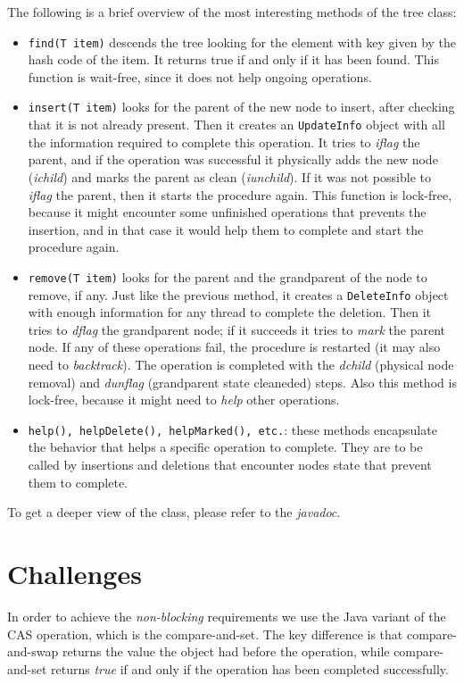 \documentclass[a4paper,12pt]{article}
\begin{document}
The following is a brief overview of the most interesting methods of the tree class:
\begin{itemize}
    \item \texttt{find(T item)} descends the tree looking for the element with key given by the hash code of the item.
    It returns true if and only if it has been found.
    This function is wait-free, since it does not help ongoing operations.
    \item \texttt{insert(T item)} looks for the parent of the new node to insert, after checking that it is not already present.
    Then it creates an \texttt{UpdateInfo} object with all the information required to complete this operation.
    It tries to \emph{iflag} the parent, and if the operation was successful it physically adds the new node (\emph{ichild}) and marks the parent as clean (\emph{iunchild}).
    If it was not possible to \emph{iflag} the parent, then it starts the procedure again.
    This function is lock-free, because it might encounter some unfinished operations that prevents the insertion, and in that case it would help them to complete and start the procedure again.
    \item \texttt{remove(T item)} looks for the parent and the grandparent of the node to remove, if any.
    Just like the previous method, it creates a \texttt{DeleteInfo} object with enough information for any thread to complete the deletion.
    Then it tries to \emph{dflag} the grandparent node; if it succeeds it tries to \emph{mark} the parent node.
    If any of these operations fail, the procedure is restarted (it may also need to \emph{backtrack}).
    The operation is completed with the \emph{dchild} (physical node removal) and \emph{dunflag} (grandparent state cleaneded) steps.
    Also this method is lock-free, because it might need to \emph{help} other operations.
    \item \texttt{help(), helpDelete(), helpMarked(), etc.}: these methods encapsulate the behavior that helps a specific operation to complete.
    They are to be called by insertions and deletions that encounter nodes state that prevent them to complete.
\end{itemize}
To get a deeper view of the class, please refer to the \emph{javadoc}.

\section{Challenges} %
\label{sec:challenges}
In order to achieve the \emph{non-blocking} requirements we use the Java variant of the \acf{CAS} operation, which is the compare-and-set.
The key difference is that compare-and-swap returns the value the object had before the operation, while compare-and-set returns \emph{true} if and only if the operation has been completed successfully.
\end{document}

